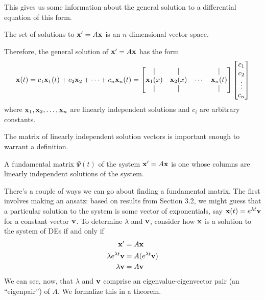 \documentclass[../m082main.tex]{subfiles}
\begin{document}
This gives us some information about the general solution to a differential equation of this form.

\begin{corollary}
    The set of solutions to $\mathbf{x}' = A \mathbf{x}$ is an $n$-dimensional vector space.
\end{corollary}

Therefore, the general solution of $\mathbf{x}' = A \mathbf{x}$ has the form
\[ \mathbf{x}(t) = c_1 \mathbf{x}_1(t) + c_2 \mathbf{x}_2 + \cdots + c_n \mathbf{x}_n (t) = \begin{bmatrix} | & | &  & | \\ \mathbf{x}_1(x) & \mathbf{x}_2(x) & \cdots & \mathbf{x}_n(t) \\ | & | &  & | \end{bmatrix} \begin{bmatrix} c_1 \\ c_2 \\ \vdots \\ c_n \end{bmatrix} \]
where $\mathbf{x}_1, \mathbf{x}_2, \ldots, \mathbf{x}_n$ are linearly independent solutions and $c_i$ are arbitrary constants.

The matrix of linearly independent solution vectors is important enough to warrant a definition.

\begin{definition}
    A fundamental matrix $\Psi (t)$ of the system $\mathbf{x}' = A \mathbf{x}$ is one whose columns are linearly independent solutions of the system.
\end{definition}

There's a couple of ways we can go about finding a fundamental matrix.
The first involves making an ansatz: based on results from Section 3.2, we might guess that a particular solution to the system is some vector of exponentials, say $\mathbf{x}(t) = e^{\lambda t} \mathbf{v}$ for a constant vector $\mathbf{v}$.
To determine $\lambda$ and $\mathbf{v}$, consider how $\mathbf{x}$ is a solution to the system of DEs if and only if
\begin{align*}
    \mathbf{x}' &= A \mathbf{x} \\
    \lambda e^{\lambda t} \mathbf{v} &= A (e^{\lambda t} \mathbf{v}) \\
    \lambda \mathbf{v} &= A \mathbf{v}
\end{align*}
We can see, now, that $\lambda$ and $\mathbf{v}$ comprise an eigenvalue-eigenvector pair (an ``eigenpair'') of $A$.
We formalize this in a theorem.
\end{document}
